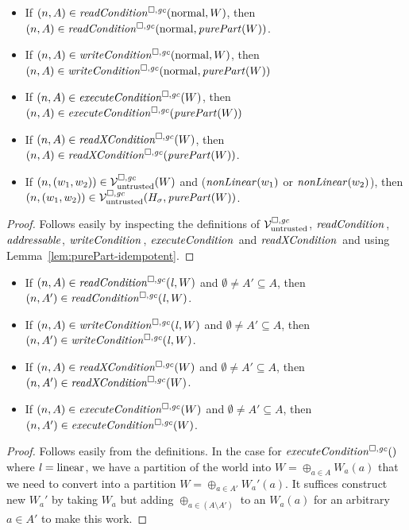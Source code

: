 \documentclass[a4paper]{article}
\begin{document}
\begin{lemma}
  \label{lem:non-linear-pure}

  \begin{itemize}
  \item If $\npair{A} \in \readCond{\normal,W}$, then $\npair{A} \in \readCond{}(\normal, \purePart{W} )$.
  \item If $\npair{A} \in \writeCond{\normal,W}$, then $\npair{A} \in \writeCond{}(\normal,\purePart{W})$
  \item If $\npair{A} \in \execCond{W}$, then $\npair{A} \in \execCond{}(\purePart{W})$
  \item If $\npair{A} \in \xReadCond{W}$, then $\npair{A} \in \xReadCond{}(\purePart{W} )$.
  \item If $\left(n,(w_1,w_2)\right) \in \mathcal{V}^{\square,\mathit{gc}}_{\mathrm{untrusted}}(W)$ and ($\nonLinear{w_1}$ or
    $\nonLinear{w_2}$), then
    $\npair{(w_1,w_2)} \in \lrv(H_\sigma,\purePart{W})$.
  \end{itemize}
\end{lemma}
\begin{proof}
  Follows easily by inspecting the definitions of $\mathcal{V}^{\square,\mathit{gc}}_{\mathrm{untrusted}}$, $\readCond[]{}$, $\addressable{}$, $\writeCond[]{}$, $\execCond[]{}$ and $\xReadCond[]{}$ and using Lemma~\ref{lem:purePart-idempotent}.
\end{proof}

\begin{lemma}
  \label{lem:conds-shrinkable}
  \begin{itemize}
  \item If $\npair{A} \in \readCond{\lin,W}$  and $\emptyset \neq A' \subseteq A$, then
    $\npair{A'} \in \readCond{\lin,W}$.
  \item If $\npair{A} \in \writeCond{\lin,W}$  and $\emptyset \neq A' \subseteq A$, then
    $\npair{A'} \in \writeCond{\lin,W}$.
  \item If $\npair{A} \in \xReadCond{W}$  and $\emptyset \neq A' \subseteq A$, then
    $\npair{A'} \in \xReadCond{W}$.
  \item If $\npair{A} \in \execCond{W}$  and $\emptyset \neq A' \subseteq A$, then
    $\npair{A'} \in \execCond{W}$.
  \end{itemize}
\end{lemma}
\begin{proof}
  Follows easily from the definitions.
  In the case for $\execCond$ where $\mathit{l} = \mathrm{linear}$, we have a partition of the world into $W = \oplus_{a \in A} W_a(a)$ that we need to convert into a partition $W = \oplus_{a \in A'} W_a'(a)$.
  It suffices construct new $W_a'$ by taking $W_a$ but adding $\oplus_{a\in(A\setminus A')}$ to an $W_a(a)$ for an arbitrary $a \in A'$ to make this work.
\end{proof}
\end{document}
